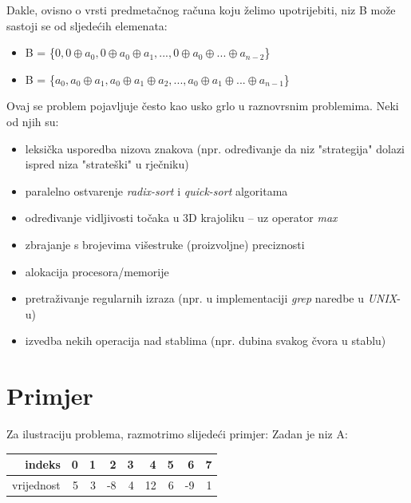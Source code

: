 \documentclass[times, utf8, zavrsni, numeric]{fer}
\begin{document}
Dakle, ovisno o vrsti predmetačnog računa koju želimo upotrijebiti, niz B može sastoji se od sljedećih elemenata:
\begin{itemize}
\item B = \{$0, 0 \oplus a_{0}, 0 \oplus a_{0} \oplus a_{1}, ..., 0 \oplus a_{0} \oplus ... \oplus a_{n-2}$\}
\item B = \{$a_{0}, a_{0} \oplus a_{1}, a_{0} \oplus a_{1} \oplus a_{2}, ..., a_{0} \oplus a_{1} \oplus ... \oplus a_{n-1}$\}
\end{itemize}

Ovaj se problem pojavljuje često kao usko grlo u raznovrsnim problemima. Neki od njih su:
\begin{itemize}
\item leksička usporedba nizova znakova (npr. određivanje da niz "strategija" dolazi ispred niza "strateški" u rječniku)
\item paralelno ostvarenje \textit{radix-sort} i \textit{quick-sort} algoritama
\item određivanje vidljivosti točaka u 3D krajoliku – uz operator \textit{max}
\item zbrajanje s brojevima višestruke (proizvoljne) preciznosti
\item alokacija procesora/memorije
\item pretraživanje regularnih izraza (npr. u implementaciji \textit{grep} naredbe u \textit{UNIX}-u)
\item izvedba nekih operacija nad stablima (npr. dubina svakog čvora u stablu)
\end{itemize}

\section{Primjer}

Za ilustraciju problema, razmotrimo slijedeći primjer:
Zadan je niz A:
\begin{center}
\begin{tabular}{| r | r | r | r | r | r | r | r | r |}
\hline
\cellcolor{lightgray}indeks & \cellcolor{lightgray}0 & \cellcolor{lightgray}1 & \cellcolor{lightgray}2 & \cellcolor{lightgray}3 & \cellcolor{lightgray}4 & \cellcolor{lightgray}5 & \cellcolor{lightgray}6 & \cellcolor{lightgray}7 \\
\hline
vrijednost & 5 & 3 & -8 & 4 & 12 & 6 & -9 & 1\\
\hline
\end{tabular}
\end{center}
\end{document}
